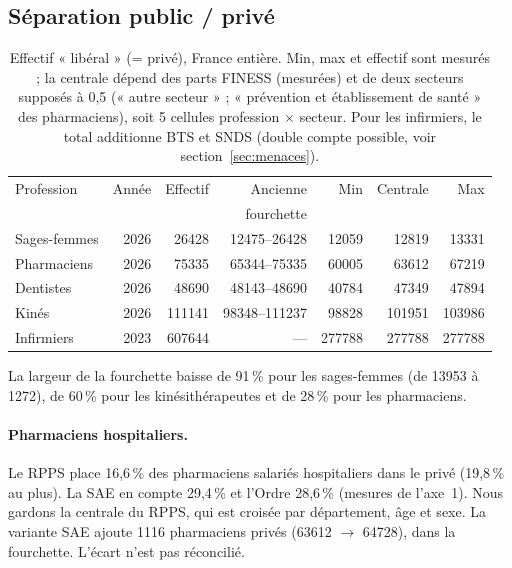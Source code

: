 \documentclass[11pt]{article}
\begin{document}
\subsection{Séparation public / privé}\label{sec:res-secteur}
\begin{table}[h]
\centering\small
\setlength{\tabcolsep}{4pt}
\begin{tabular}{@{}lrrrrrr@{}}
\toprule
Profession & Année & Effectif & Ancienne & Min & Centrale & Max \\
 & & & fourchette & & & \\
\midrule
Sages-femmes & 2026 & \num{26428} & \num{12475}--\num{26428} & \num{12059} & \num{12819} & \num{13331} \\
Pharmaciens  & 2026 & \num{75335} & \num{65344}--\num{75335} & \num{60005} & \num{63612} & \num{67219} \\
Dentistes    & 2026 & \num{48690} & \num{48143}--\num{48690} & \num{40784} & \num{47349} & \num{47894} \\
Kinés        & 2026 & \num{111141} & \num{98348}--\num{111237} & \num{98828} & \num{101951} & \num{103986} \\
Infirmiers   & 2023 & \num{607644} & --- & \num{277788} & \num{277788} & \num{277788} \\
\bottomrule
\end{tabular}
\caption{Effectif « libéral » (= privé), France entière. Min, max et effectif sont mesurés\mesure{} ; la centrale
dépend des parts FINESS (mesurées\mesure{}) et de deux secteurs supposés à 0,5\suppose{} (« autre secteur » ; « prévention et établissement de santé » des pharmaciens), soit 5 cellules profession $\times$ secteur. Pour les infirmiers, le
total additionne BTS et SNDS (double compte possible, voir section~\ref{sec:menaces}).}
\label{tab:fourchettes}
\end{table}

La largeur de la fourchette baisse de 91\,\% pour les sages-femmes (de \num{13953} à \num{1272}), de 60\,\% pour
les kinésithérapeutes et de 28\,\% pour les pharmaciens\derive{}.

\paragraph{Pharmaciens hospitaliers.} Le RPPS place 16,6\,\% des pharmaciens salariés hospitaliers dans le privé
(19,8\,\% au plus)\mesure{}. La SAE en compte 29,4\,\% et l'Ordre 28,6\,\% (mesures de l'axe~1). Nous gardons
la centrale du RPPS, qui est croisée par département, âge et sexe. La variante SAE ajoute \num{1116} pharmaciens
privés\derive{} (\num{63612} $\rightarrow$ \num{64728}), dans la fourchette. L'écart n'est pas réconcilié.
\end{document}

